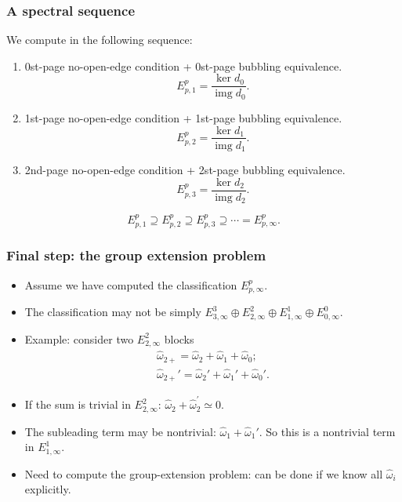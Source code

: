\documentclass[xcolor=table, 11pt, aspectratio=169]{beamer}
\DeclareMathOperator{\img}{img}
\begin{document}
\begin{frame}
\frametitle{A spectral sequence}
We compute in the following sequence:
\begin{enumerate}
\item 0st-page no-open-edge condition + 0st-page bubbling equivalence.
\[E^p_{p,1}=\frac{\ker d_0}{\img d_0}.\]
\item 1st-page no-open-edge condition + 1st-page bubbling equivalence.
\[E^p_{p,2}=\frac{\ker d_1}{\img d_1}.\]
\item 2nd-page no-open-edge condition + 2st-page bubbling equivalence.
\[E^p_{p,3}=\frac{\ker d_2}{\img d_2}.\]
\end{enumerate}

\[E^p_{p,1}\supseteq E^p_{p,2}\supseteq E^p_{p,3}\supseteq\cdots=E^p_{p,\infty}.\]
\end{frame}


\begin{frame}
\frametitle{Final step: the group extension problem}
\begin{itemize}
\item Assume we have computed the classification $E^p_{p,\infty}$.
\item The classification may not be simply $E^3_{3,\infty}\oplus E^2_{2,\infty}\oplus E^1_{1,\infty} \oplus E^0_{0,\infty}$.
\item Example: consider two $E^2_{2,\infty}$ blocks
\begin{align*}
\hat\omega_{2+}=\hat\omega_2+\hat\omega_1+\hat\omega_0;\\
\hat\omega_{2+}'=\hat\omega_2'+\hat\omega_1'+\hat\omega_0'.
\end{align*}
\item If the sum is trivial in $E^2_{2,\infty}$: $\hat\omega_2+\hat\omega_2^\prime\simeq0$.
\item The subleading term may be nontrivial: $\hat\omega_1+\hat\omega_1'$. So this is a nontrivial term in $E^1_{1,\infty}$.
\item Need to compute the group-extension problem: can be done if we know all $\hat\omega_i$ explicitly.
\end{itemize}
\end{frame}
\end{document}
